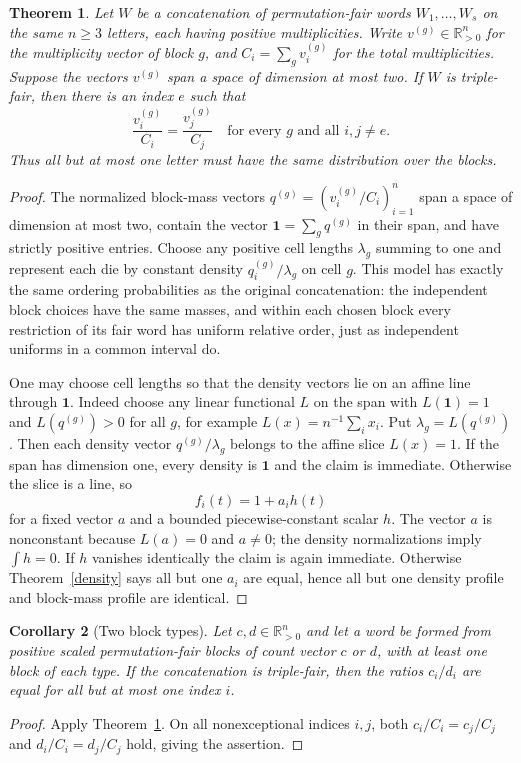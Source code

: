 \documentclass[11pt]{article}
\newtheorem{theorem}{Theorem}
\newtheorem{corollary}[theorem]{Corollary}
\begin{document}
\begin{theorem}\label{blocks}
Let $W$ be a concatenation of permutation-fair words $W_1,\ldots,W_s$
on the same $n\ge3$ letters, each having positive multiplicities.
Write $v^{(g)}\in\mathbb R_{>0}^n$ for the multiplicity vector of block
$g$, and $C_i=\sum_gv_i^{(g)}$ for the total multiplicities.
Suppose the vectors $v^{(g)}$ span a space of dimension at most two.
If $W$ is triple-fair, then there is an index $e$ such that
\[
 \frac{v_i^{(g)}}{C_i}=\frac{v_j^{(g)}}{C_j}
 \quad\text{for every }g\text{ and all }i,j\ne e.
\]
Thus all but at most one letter must have the same distribution over the
blocks.
\end{theorem}
\begin{proof}
The normalized block-mass vectors
$q^{(g)}=(v_i^{(g)}/C_i)_{i=1}^n$ span a space of dimension at most two,
contain the vector $\mathbf1=\sum_gq^{(g)}$ in their span, and have
strictly positive entries. Choose any positive cell lengths $\lambda_g$
summing to one and represent each die by constant density
$q_i^{(g)}/\lambda_g$ on cell $g$.
This model has exactly the same ordering probabilities as the original
concatenation: the independent block choices have the same masses, and
within each chosen block every restriction of its fair word has uniform
relative order, just as independent uniforms in a common interval do.

One may choose cell lengths so that the density vectors lie on an affine
line through $\mathbf1$. Indeed choose any linear functional $L$ on the
span with $L(\mathbf1)=1$ and $L(q^{(g)})>0$ for all $g$, for example
$L(x)=n^{-1}\sum_i x_i$. Put $\lambda_g=L(q^{(g)})$.
Then each density vector $q^{(g)}/\lambda_g$ belongs to the affine slice
$L(x)=1$. If the span has dimension one, every density is $\mathbf1$ and
the claim is immediate. Otherwise the slice is a line, so
\[
 f_i(t)=1+a_i h(t)
\]
for a fixed vector $a$ and a bounded piecewise-constant scalar $h$.
The vector $a$ is nonconstant because $L(a)=0$ and $a\ne0$; the density
normalizations imply $\int h=0$. If $h$ vanishes identically the claim
is again immediate. Otherwise Theorem~\ref{density} says all but one
$a_i$ are equal, hence all but one density profile and block-mass profile
are identical.
\end{proof}

\begin{corollary}[Two block types]\label{two}
Let $c,d\in\mathbb R_{>0}^n$ and let a word be formed from positive
scaled permutation-fair blocks of count vector $c$ or $d$, with at least
one block of each type. If the concatenation is triple-fair, then the
ratios $c_i/d_i$ are equal for all but at most one index $i$.
\end{corollary}
\begin{proof}
Apply Theorem~\ref{blocks}. On all nonexceptional indices $i,j$, both
$c_i/C_i=c_j/C_j$ and $d_i/C_i=d_j/C_j$ hold, giving the assertion.
\end{proof}
\end{document}
